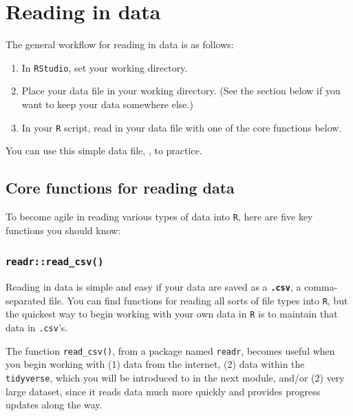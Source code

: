 \documentclass[
]{book}
\providecommand{\tightlist}{%
  \setlength{\itemsep}{0pt}\setlength{\parskip}{0pt}}
\begin{document}
\hypertarget{reading-in-data}{%
\section*{Reading in data}\label{reading-in-data}}

The general workflow for reading in data is as follows:

\begin{enumerate}
\def\labelenumi{\arabic{enumi}.}
\tightlist
\item
  In \texttt{RStudio}, set your working directory.
\item
  Place your data file in your working directory. (See the section below if you want to keep your data somewhere else.)
\item
  In your \texttt{R} script, read in your data file with one of the core functions below.
\end{enumerate}

You can use this simple data file, , to practice.

\hypertarget{core-functions-for-reading-data}{%
\subsection*{Core functions for reading data}\label{core-functions-for-reading-data}}

To become agile in reading various types of data into \texttt{R}, here are five key functions you should know:

\hypertarget{readrread_csv}{%
\subsubsection*{\texorpdfstring{\texttt{readr::read\_csv()}}{readr::read\_csv()}}\label{readrread_csv}}

Reading in data is simple and easy if your data are saved as a \textbf{\texttt{.csv}}, a comma-separated file. You can find functions for reading all sorts of file types into \texttt{R}, but the quickest way to begin working with your own data in \texttt{R} is to maintain that data in \texttt{.csv}'s.

The function \texttt{read\_csv()}, from a package named \texttt{readr}, becomes useful when you begin working with (1) data from the internet, (2) data within the \texttt{tidyverse}, which you will be introduced to in the next module, and/or (2) very large dataset, since it reads data much more quickly and provides progress updates along the way.
\end{document}

